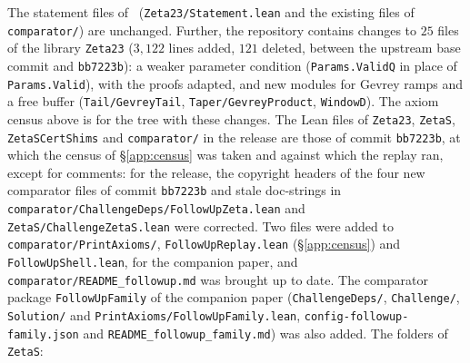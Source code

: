 The statement files of~\cite{AF} (\texttt{Zeta23/Statement.lean} and the existing files of \texttt{comparator/}) are unchanged. Further,
the repository contains changes to $25$ files of the library \texttt{Zeta23} ($3{,}122$ lines added, $121$ deleted, between the upstream base
commit and \texttt{bb7223b}): a weaker parameter condition
(\texttt{Params.ValidQ} in place of \texttt{Params.Valid}), with the proofs adapted, and new modules for Gevrey ramps and a free buffer
(\texttt{Tail/GevreyTail}, \texttt{Taper/GevreyProduct}, \texttt{WindowD}). The axiom census above is for the tree with these changes.
The Lean files of \texttt{Zeta23}, \texttt{ZetaS}, \texttt{ZetaSCertShims} and \texttt{comparator/} in the release are those of commit
\texttt{bb7223b}, at which the census of \S\ref{app:census} was taken and against which the replay ran, except for comments: for the release,
the copyright headers of the four new comparator files of commit \texttt{bb7223b} and stale doc-strings in
\texttt{comparator/ChallengeDeps/FollowUpZeta.lean} and \texttt{ZetaS/ChallengeZetaS.lean} were corrected. Two files were added to
\texttt{comparator/PrintAxioms/}, \texttt{FollowUpReplay.lean} (\S\ref{app:census}) and \texttt{FollowUpShell.lean}, for the companion paper,
and \texttt{comparator/README\_followup.md} was brought up to date. The comparator package \texttt{FollowUpFamily} of the companion paper
(\texttt{ChallengeDeps/}, \texttt{Challenge/}, \texttt{Solution/} and \texttt{PrintAxioms/FollowUpFamily.lean}, \texttt{config-followup-family.json}
and \texttt{README\_followup\_family.md}) was also added.
The folders of \texttt{ZetaS}:

